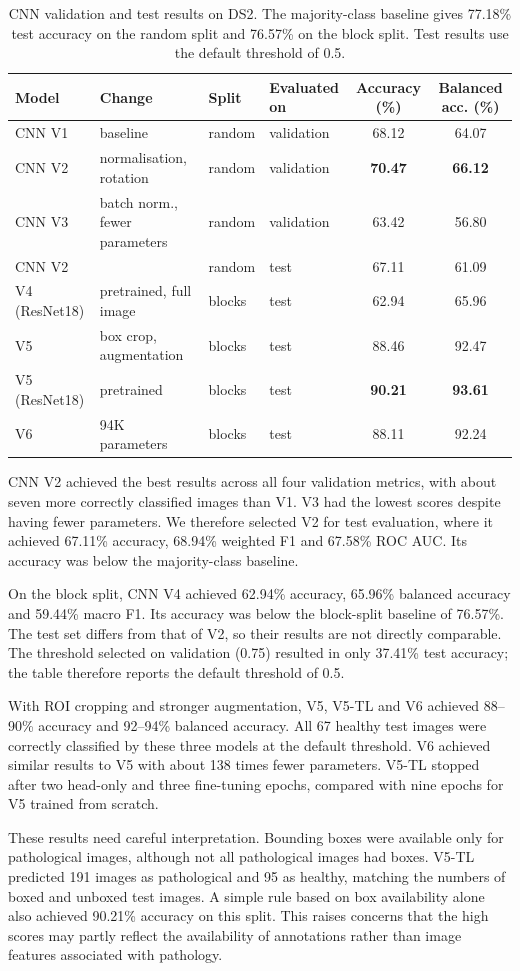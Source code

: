 \begin{table}[t]
\centering
\caption{CNN validation and test results on DS2. The majority-class baseline gives 77.18\% test accuracy on the random split and 76.57\% on the block split. Test results use the default threshold of 0.5.}
\label{tab:cnn-results}
\small
\begin{tabular}{llllcc}
\toprule
Model & Change & Split & Evaluated on & Accuracy (\%) & Balanced acc. (\%) \\
\midrule
CNN V1 & baseline & random & validation & 68.12 & 64.07 \\
CNN V2 & normalisation, rotation & random & validation & \textbf{70.47} & \textbf{66.12} \\
CNN V3 & batch norm., fewer parameters & random & validation & 63.42 & 56.80 \\
\midrule
CNN V2 & & random & test & 67.11 & 61.09 \\
V4 (ResNet18) & pretrained, full image & blocks & test & 62.94 & 65.96 \\
\midrule
V5 & box crop, augmentation & blocks & test & 88.46 & 92.47 \\
V5 (ResNet18) & pretrained & blocks & test & \textbf{90.21} & \textbf{93.61} \\
V6 & 94K parameters & blocks & test & 88.11 & 92.24 \\
\bottomrule
\end{tabular}
\end{table}

CNN V2 achieved the best results across all four validation metrics, with about seven more correctly classified images than V1. V3 had the lowest scores despite having fewer parameters. We therefore selected V2 for test evaluation, where it achieved 67.11\% accuracy, 68.94\% weighted F1 and 67.58\% ROC AUC. Its accuracy was below the majority-class baseline.

On the block split, CNN V4 achieved 62.94\% accuracy, 65.96\% balanced accuracy and 59.44\% macro F1. Its accuracy was below the block-split baseline of 76.57\%. The test set differs from that of V2, so their results are not directly comparable. The threshold selected on validation (0.75) resulted in only 37.41\% test accuracy; the table therefore reports the default threshold of 0.5.

With ROI cropping and stronger augmentation, V5, V5-TL and V6 achieved 88--90\% accuracy and 92--94\% balanced accuracy. All 67 healthy test images were correctly classified by these three models at the default threshold. V6 achieved similar results to V5 with about 138 times fewer parameters. V5-TL stopped after two head-only and three fine-tuning epochs, compared with nine epochs for V5 trained from scratch.

These results need careful interpretation. Bounding boxes were available only for pathological images, although not all pathological images had boxes. V5-TL predicted 191 images as pathological and 95 as healthy, matching the numbers of boxed and unboxed test images. A simple rule based on box availability alone also achieved 90.21\% accuracy on this split. This raises concerns that the high scores may partly reflect the availability of annotations rather than image features associated with pathology.

